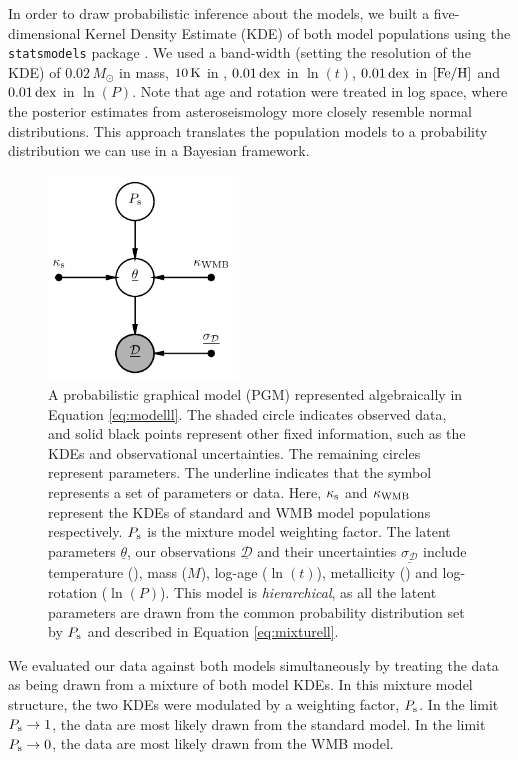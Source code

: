 In order to draw probabilistic inference about the models, we built a five-dimensional Kernel Density Estimate (KDE) of both model populations using the \texttt{statsmodels} package \cite{seabold+perktold2010}. We used a band-width (setting the resolution of the KDE) of $0.02\, M_\odot$ in mass, $10\, \rm K$ in \teff, $0.01\, \rm{dex}$ in $\ln(t)$, $0.01\, \rm{dex}$ in $\rm{[Fe/H]}$ and $0.01\, \rm{dex}$ in $\ln(P)$. Note that age and rotation were treated in log space, where the posterior estimates from asteroseismology more closely resemble normal distributions. This approach translates the population models to a probability distribution we can use in a Bayesian framework.

\begin{figure}
	\centering
	\includegraphics[width=0.45\textwidth]{pgm_models.pdf}
	\caption{A probabilistic graphical model (PGM) represented algebraically in Equation \ref{eq:modelll}. The shaded circle indicates observed data, and solid black points represent other fixed information, such as the KDEs and observational uncertainties. The remaining circles represent parameters. The underline indicates that the symbol represents a set of parameters or data. Here, $\kappa_{\rm{s}}$ and $\kappa_{\rm WMB}$ represent the KDEs of standard and WMB model populations respectively. $P_{\rm{s}}$ is the mixture model weighting factor. The latent parameters $\underline{\theta}$, our observations $\underline{\mathcal{D}}$ and their uncertainties $\underline{\sigma_{\mathcal{D}}}$ include temperature (\teff), mass ($M$), log-age ($\ln(t)$), metallicity (\feh) and log-rotation ($\ln(P)$). This model is \textit{hierarchical}, as all the latent parameters are drawn from the common probability distribution set by $P_{\rm{s}}$ and described in Equation \ref{eq:mixturell}.}
	\label{fig:pgm}
\end{figure}

We evaluated our data against both models simultaneously by treating the data as being drawn from a mixture of both model KDEs. In this mixture model structure, the two KDEs were modulated by a weighting factor, $P_{\rm s}$. In the limit $P_{\rm s} \rightarrow 1$, the data are most likely drawn from the standard model. In the limit $P_{\rm s} \rightarrow 0$, the data are most likely drawn from the WMB model.

